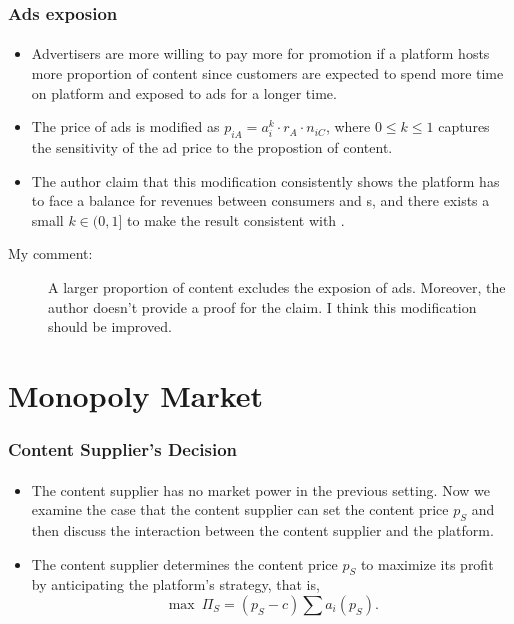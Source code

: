 \documentclass{beamer}
\newcommand{\adv}{\text{advertiser}}
\newcommand{\Pp}[1]{\text{Proposition #1}}
\begin{document}
\begin{frame}%
    \frametitle{Ads exposion}
    \framesubtitle{}
    \begin{itemize}
        \item Advertisers are more willing to pay more for promotion if
            a platform hosts more proportion of content since customers
            are expected to spend more time on platform and exposed to
            ads for a longer time.
        \item The price of ads is modified as $p_{iA}=a_i^k\cdot r_A\cdot n_{iC}$,
            where $0\leq k\leq1$ captures the sensitivity of the ad price to the
            propostion of content.
        \item The author claim that this modification consistently shows the platform
            has to face a balance for revenues between consumers and \adv s,
            and there exists a small $k\in(0,1]$ to make the result consistent with
            \Pp{2}.
    \end{itemize}
    \begin{description}
        \item[\textcolor{myred}{My comment:}] \textcolor{myred}{A larger proportion 
            of content excludes the exposion of ads. 
            Moreover, the author doesn't provide a proof for the claim.
            I think this modification should be improved.}
    \end{description}
\end{frame}

\section{Monopoly Market}
\begin{frame}%
    \frametitle{Content Supplier's Decision}
    \framesubtitle{}
    \begin{itemize}
        \item The content supplier has no market power in the previous setting.
            Now we examine the case that the content supplier can set the content price
            $p_S$ and then discuss the interaction between the content supplier and 
            the platform.
        \item The content supplier determines the content price $p_S$ 
            to maximize its profit by anticipating
            the platform's strategy, that is,
            \[
                \max\ \Pi_S=(p_S-c)\sum a_i(p_S).
            \]
    \end{itemize}
\end{frame}
\end{document}
